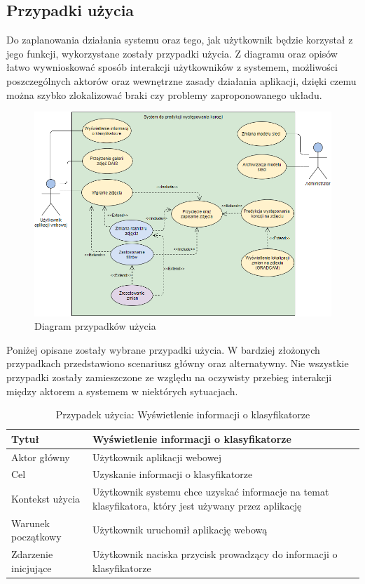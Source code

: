 \documentclass[polish,12pt]{aghthesis}
\begin{document}
\newpage
\subsection{Przypadki użycia}
Do zaplanowania działania systemu oraz tego, jak użytkownik będzie korzystał z jego funkcji, wykorzystane zostały przypadki użycia. Z diagramu oraz opisów łatwo wywnioskować sposób interakcji użytkowników z systemem, możliwości poszczególnych aktorów oraz wewnętrzne zasady działania aplikacji, dzięki czemu można szybko zlokalizować braki czy problemy zaproponowanego układu. 

\begin{figure}[h]
    \centering
    \label{fig:use-case-diagram}    \includegraphics[width=16cm]{images/usecase-diagram-admin.PNG}
    \caption{Diagram przypadków użycia}
\end{figure}

Poniżej opisane zostały wybrane przypadki użycia. W bardziej złożonych przypadkach przedstawiono scenariusz główny oraz alternatywny. Nie wszystkie przypadki zostały zamieszczone ze względu na oczywisty przebieg interakcji między aktorem a systemem w niektórych sytuacjach.

\begin{table}[h!]
\centering
 \begin{tabular}{|m{4cm}|m{11cm}|} 
 \hline
 Tytuł & Wyświetlenie informacji o klasyfikatorze\\
 \hline
 Aktor główny & Użytkownik aplikacji webowej\\
 \hline
 Cel & Uzyskanie informacji o klasyfikatorze\\ 
 \hline
 Kontekst użycia & Użytkownik systemu chce uzyskać informacje na temat klasyfikatora, który jest używany przez aplikację\\ 
 \hline
 Warunek początkowy & Użytkownik uruchomił aplikację webową\\
 \hline
 Zdarzenie inicjujące & Użytkownik naciska przycisk prowadzący do informacji o klasyfikatorze\\
 \hline
\end{tabular}
\caption{Przypadek użycia: Wyświetlenie informacji o klasyfikatorze}
\label{table:1}
\end{table}
\end{document}
